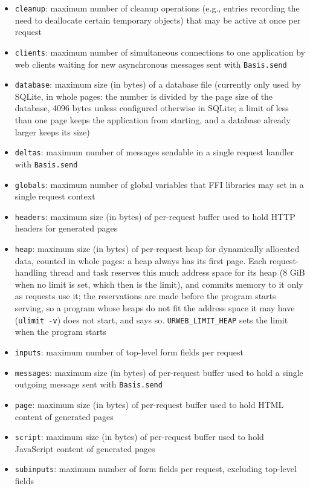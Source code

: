 \documentclass{article}
\newcommand{\cd}[1]{\texttt{#1}}
\begin{document}
\begin{itemize}
  \begin{itemize}
  \item \texttt{cleanup}: maximum number of cleanup operations (e.g., entries recording the need to deallocate certain temporary objects) that may be active at once per request
  \item \texttt{clients}: maximum number of simultaneous connections to one application by web clients waiting for new asynchronous messages sent with \texttt{Basis.send}
  \item \texttt{database}: maximum size (in bytes) of a database file (currently only used by SQLite, in whole pages: the number is divided by the page size of the database, 4096 bytes unless configured otherwise in SQLite; a limit of less than one page keeps the application from starting, and a database already larger keeps its size)
  \item \texttt{deltas}: maximum number of messages sendable in a single request handler with \texttt{Basis.send}
  \item \texttt{globals}: maximum number of global variables that FFI libraries may set in a single request context
  \item \texttt{headers}: maximum size (in bytes) of per-request buffer used to hold HTTP headers for generated pages
  \item \texttt{heap}: maximum size (in bytes) of per-request heap for dynamically allocated data, counted in whole pages: a heap always has its first page.  Each request-handling thread and task reserves this much address space for its heap (8 GiB when no limit is set, which then is the limit), and commits memory to it only as requests use it; the reservations are made before the program starts serving, so a program whose heaps do not fit the address space it may have (\texttt{ulimit -v}) does not start, and says so.  \cd{URWEB\_LIMIT\_HEAP} sets the limit when the program starts
  \item \texttt{inputs}: maximum number of top-level form fields per request
  \item \texttt{messages}: maximum size (in bytes) of per-request buffer used to hold a single outgoing message sent with \texttt{Basis.send}
  \item \texttt{page}: maximum size (in bytes) of per-request buffer used to hold HTML content of generated pages
  \item \texttt{script}: maximum size (in bytes) of per-request buffer used to hold JavaScript content of generated pages
  \item \texttt{subinputs}: maximum number of form fields per request, excluding top-level fields

\end{itemize}
\end{itemize}
\end{document}
